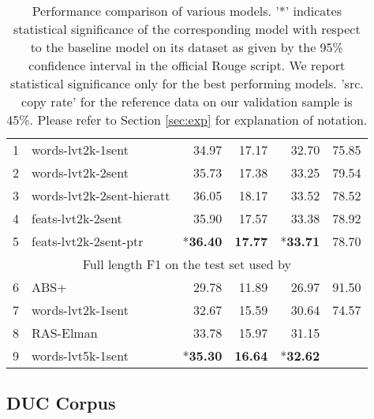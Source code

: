 \documentclass[11pt]{article}
\begin{document}
\begin{table*}
\begin{center}
{\begin{tabular}{|r|l|r|r|r|r|}
1 & words-lvt2k-1sent      &    34.97              &    17.17                 &   32.70           &   75.85  \\
2 & words-lvt2k-2sent      &     35.73             &    17.38                 &   33.25           &    79.54 \\
3 & words-lvt2k-2sent-hieratt &   36.05          &    18.17                 &   33.52            &    78.52   \\
4 & feats-lvt2k-2sent             &   35.90           &    17.57                &   33.38         &      78.92          \\
5 & feats-lvt2k-2sent-ptr   &   *{\bf 36.40}            &    {\bf 17.77}                 &        *{\bf 33.71}   & 78.70  \\
\hline
\multicolumn{6}{|c|}{Full length F1 on the test set used by \cite{namas}}  \\
\hline
6 & ABS+ \cite{namas}  &    29.78      &      11.89             &     26.97        &   91.50       \\
7 & words-lvt2k-1sent & 32.67 &  15.59   & 30.64   &  74.57     \\
8 & RAS-Elman \cite{chopra} & 33.78 &  15.97  & 31.15 & \\
9 & words-lvt5k-1sent & *{\bf 35.30} & {\bf 16.64} & *{\bf 32.62} & \\
\hline
\end{tabular}
}
\end{center}
\vspace{-0.1in}
\caption{{\small Performance comparison of various models. '*' indicates statistical significance of the corresponding model with respect to the baseline model on its dataset as given by the 95\% confidence interval in the official Rouge script. We report statistical significance only for the best performing models. 'src. copy rate' for the reference data on our validation sample is 45\%. Please refer to Section \ref{sec:exp} for explanation of notation.}}
\label{tab:results}
\vspace{-0.2in}
\end{table*}


\subsection{DUC Corpus}
\end{document}

